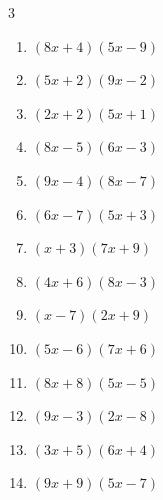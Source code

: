\begin{multicols}{3}
\begin{enumerate}

  \item $(8x+4)(5x-9)$


  \item $(5x+2)(9x-2)$


  \item $(2x+2)(5x+1)$


  \item $(8x-5)(6x-3)$


  \item $(9x-4)(8x-7)$


  \item $(6x-7)(5x+3)$


  \item $(x+3)(7x+9)$


  \item $(4x+6)(8x-3)$


\columnbreak %

  \item $(x-7)(2x+9)$


  \item $(5x-6)(7x+6)$


  \item $(8x+8)(5x-5)$


  \item $(9x-3)(2x-8)$


  \item $(3x+5)(6x+4)$


  \item $(9x+9)(5x-7)$



\end{enumerate}
\end{multicols}
